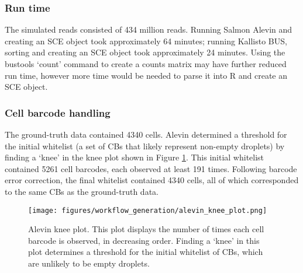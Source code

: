
\subsubsection{Run time}
The simulated reads consisted of 434 million reads.
Running Salmon Alevin and creating an SCE object took approximately 64 minutes;
running Kallisto BUS, sorting and creating an SCE object took approximately 24 minutes.
Using the bustools `count' command to create a counts matrix may have further reduced run time, however more time would be needed to parse it into R and create an SCE object.

\subsubsection{Cell barcode handling}
The ground-truth data contained 4340 cells.
Alevin determined a threshold for the initial whitelist (a set of CBs that likely represent non-empty droplets) by finding a `knee' in the knee plot shown in Figure \ref{fig:alevin_knee}.
This initial whitelist contained 5261 cell barcodes, each observed at least 191 times.
Following barcode error correction, the final whitelist contained 4340 cells, all of which corresponded to the same CBs as the ground-truth data.

\begin{figure}[htb]
    \centering
    \texttt{[image: figures/workflow\_generation/alevin\_knee\_plot.png]}
    \caption[Benchmark Salmon Alevin Knee Plot]{Alevin knee plot.
    This plot displays the number of times each cell barcode is observed, in decreasing order.
    Finding a `knee' in this plot determines a threshold for the initial whitelist of CBs, which are unlikely to be empty droplets.}
    \label{fig:alevin_knee}
\end{figure}

